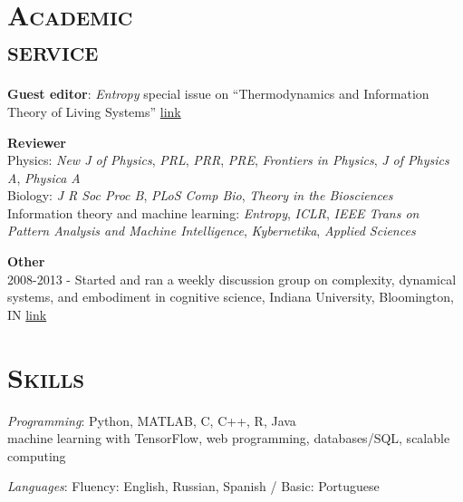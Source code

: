 \documentclass[margin,line,centered]{res}
\begin{document}
\begin{resume}
\section{\textsc{Academic\\service}}

\textbf{Guest editor}: \emph{Entropy} special issue on ``Thermodynamics and Information Theory of Living Systems'' \href{https://www.mdpi.com/journal/entropy/special_issues/thermodynamics_living_systems}{link}

\textbf{Reviewer}\\
Physics: \emph{New J of Physics}, \emph{PRL}, \emph{PRR}, \emph{PRE}, \emph{Frontiers in Physics}, \emph{J of Physics A}, \emph{Physica A}\\
Biology: \emph{J R Soc Proc B}, \emph{PLoS Comp Bio}, \emph{Theory in the Biosciences}\\
Information theory and machine learning: \emph{Entropy}, \emph{ICLR}, \emph{IEEE Trans on Pattern Analysis and Machine Intelligence}, \emph{Kybernetika}, \emph{Applied Sciences}

\textbf{Other}\\
2008-2013 - Started and ran a weekly discussion group on complexity, dynamical systems, and embodiment in cognitive science, Indiana University, Bloomington, IN \href{http://apophenia.wikidot.com/}{link}


\section{\textsc{Skills}}



\hangindent=10pt \emph{Programming}: Python, MATLAB, C, C++, R, Java\\
 machine learning with TensorFlow, web programming, databases/SQL, scalable computing %

\emph{Languages}: Fluency: English, Russian, Spanish / Basic: Portuguese

\end{resume}
\end{document}
